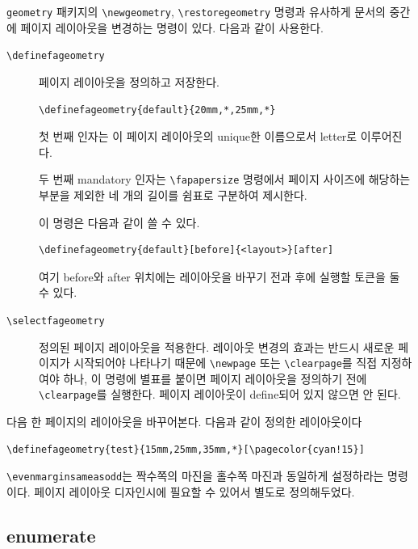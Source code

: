 \documentclass[
	12pt,
	a4paper,
	kosection,
	footnote,
	nobookmarks,
	microtype,
	figtabcapt,
]{oblivoir}
\def\cs#1{\texttt{\textbackslash #1}}
\begin{document}
\bigskip

\texttt{geometry} 패키지의 \cs{newgeometry}, \cs{restoregeometry} 명령과 유사하게
문서의 중간에 페이지 레이아웃을 변경하는 명령이 있다. 다음과 같이 사용한다.

\begin{description}
\item [\cs{definefageometry}] 페이지 레이아웃을 정의하고 저장한다.
\begin{verbatim}
\definefageometry{default}{20mm,*,25mm,*}
\end{verbatim}
첫 번째 인자는 이 페이지 레이아웃의 unique한 이름으로서 letter로 이루어진다.

두 번째 mandatory 인자는 \verb|\fapapersize| 명령에서
페이지 사이즈에 해당하는 부분을 제외한 네 개의 길이를 쉼표로 구분하여 제시한다.

이 명령은 다음과 같이 쓸 수 있다.
\begin{verbatim}
\definefageometry{default}[before]{<layout>}[after]
\end{verbatim}
여기 before와 after 위치에는 레이아웃을 바꾸기 전과 후에 실행할
토큰을 둘 수 있다.

\item[\cs{selectfageometry}] 정의된 페이지 레이아웃을 적용한다. 
레이아웃 변경의 효과는 반드시 새로운 페이지가 시작되어야 나타나기 때문에
\cs{newpage} 또는 \cs{clearpage}를 직접 지정하여야 하나,
이 명령에 별표를 붙이면 페이지 레이아웃을 정의하기 전에 \cs{clearpage}를 
실행한다. 
페이지 레이아웃이 define되어 있지 않으면 안 된다.

\end{description}

다음 한 페이지의 레이아웃을 바꾸어본다. 다음과 같이 정의한 레이아웃이다
\begin{verbatim}
\definefageometry{test}{15mm,25mm,35mm,*}[\pagecolor{cyan!15}]
\end{verbatim}

\bigskip

\cs{evenmarginsameasodd}는 짝수쪽의 마진을 홀수쪽 마진과
동일하게 설정하라는 명령이다. 페이지 레이아웃 디자인시에 필요할 수
있어서 별도로 정의해두었다.


\subsection{enumerate}
\end{document}
